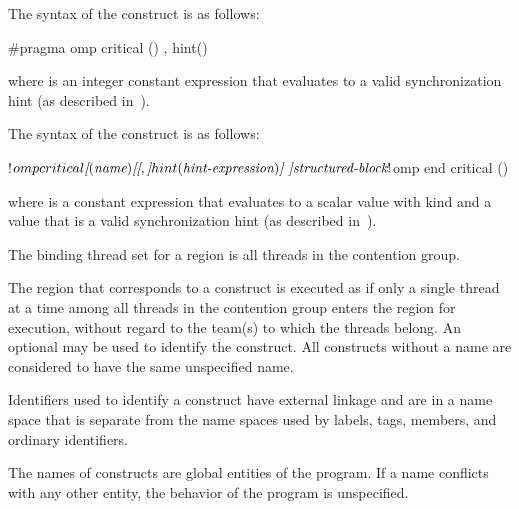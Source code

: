 \syntax
\begin{ccppspecific}
The syntax of the  construct is as follows:

\begin{ompcPragma}
  #pragma omp critical \plc{[}() \plc{[[},\plc{]} hint()\plc{] ] new-line}
\end{ompcPragma}

where  is an integer constant expression that
evaluates to a valid synchronization hint (as described in~).
\end{ccppspecific}

\begin{fortranspecific}
The syntax of the  construct is as follows:

\begin{ompfPragma}
!$omp critical \plc{[}(\plc{name}) \plc{[[},\plc{]} hint(\plc{hint-expression})\plc{] ]}
    \plc{structured-block}
!$omp end critical \plc{[}()\plc{]}
\end{ompfPragma}

where  is a constant expression that evaluates to
a scalar value with kind  and  a value
that is a valid synchronization hint (as described
in~).
\end{fortranspecific}

\binding
The binding thread set for a  region is all threads in the contention group.

\descr
The region that corresponds to a  construct is executed as if only 
a single thread at a time among all threads in the contention group enters the 
region for execution, without regard to the team(s) to which the threads belong.
An optional  may be used to identify the  construct. All 
 constructs without a name are considered to have the same 
unspecified name.

\begin{ccppspecific}
Identifiers used to identify a  construct have external linkage and are in a
name space that is separate from the name spaces used by labels, tags, members, and
ordinary identifiers.
\end{ccppspecific}

\begin{fortranspecific}
The names of  constructs are global entities of the program. If a name
conflicts with any other entity, the behavior of the program is unspecified.
\end{fortranspecific}

